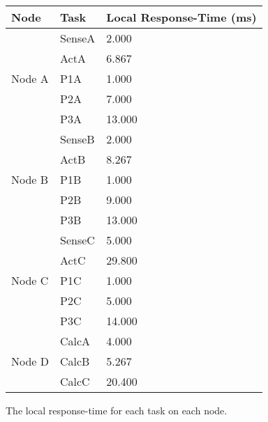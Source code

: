     \renewcommand{\arraystretch}{1.4}
    \begin{figure}[H]
    \centering
    \begin{minipage}{0.5\textwidth}
        \begin{table}[H]
        \centering
            \begin{tabular}{|l|l|l|}
            \hline
            \rowcolor{green!40}\textbf{Node} & \textbf{Task} & \textbf{Local Response-Time (ms)}   \\ \hline
            \multirow{5}{*}{Node A}     & SenseA    & 2.000 \\
                                        & ActA      & 6.867 \\ 
                                        & P1A       & 1.000 \\
                                        & P2A       & 7.000 \\
                                        & P3A       & 13.000 \\ \hline
            \multirow{5}{*}{Node B}     & SenseB    & 2.000 \\
                                        & ActB      & 8.267 \\ 
                                        & P1B       & 1.000 \\
                                        & P2B       & 9.000 \\
                                        & P3B       & 13.000 \\ \hline
            \multirow{5}{*}{Node C}     & SenseC    & 5.000 \\
                                        & ActC      & 29.800 \\ 
                                        & P1C       & 1.000 \\
                                        & P2C       & 5.000 \\
                                        & P3C       & 14.000 \\ \hline
            \multirow{3}{*}{Node D}     & CalcA     & 4.000 \\
                                        & CalcB     & 5.267 \\ 
                                        & CalcC     & 20.400 \\ \hline
            \end{tabular}
        \end{table}
    \end{minipage}
    \caption{The local response-time for each task on each node.}
    \label{fig:localresponse}
    \end{figure}
    \renewcommand{\arraystretch}{1.0}

